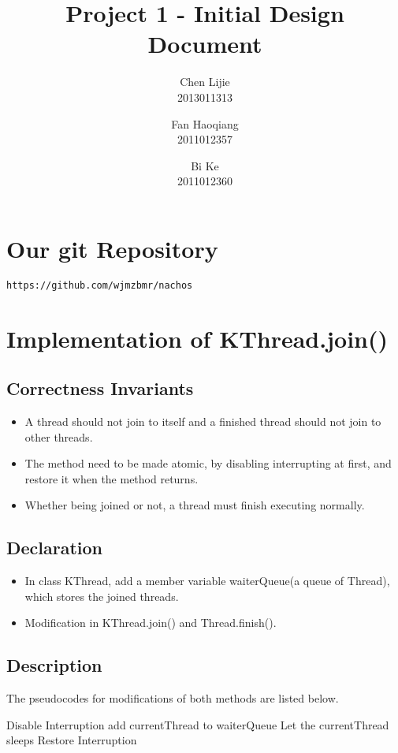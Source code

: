 \documentclass{article}
\title{Project 1 - Initial Design Document}
\author{Chen Lijie\\ 2013011313\and
	Fan Haoqiang\\ 2011012357\and
	Bi Ke\\ 2011012360}
\date{}
\begin{document}
	\maketitle
	\tableofcontents
	\section{Our git Repository}
	\texttt{https://github.com/wjmzbmr/nachos}
	\section{Implementation of KThread.join()}
	
	\subsection{Correctness Invariants}
	
	\begin{itemize}
		\item A thread should not join to itself and a finished thread should not join to other threads.
		\item The method need to be made atomic, by disabling interrupting at first, and restore it when the method returns.
		\item Whether being joined or not, a thread must finish executing normally.
	\end{itemize}

	\subsection{Declaration}
	\begin{itemize}
		\item In class KThread, add a member variable waiterQueue(a queue of Thread), which stores the joined threads.
		
		\item Modification in KThread.join() and Thread.finish().
    \end{itemize}
	
	\subsection{Description}
	
	The pseudocodes for modifications of both methods are listed below.
	
	\begin{algorithm}[H]
		\begin{algorithmic}
   				\State Disable Interruption
					\State add currentThread to waiterQueue
					\State Let the currentThread sleeps
				\EndIf
				\State Restore Interruption
			\EndProcedure
		\end{algorithmic}
	\end{algorithm}
	
\end{document}
